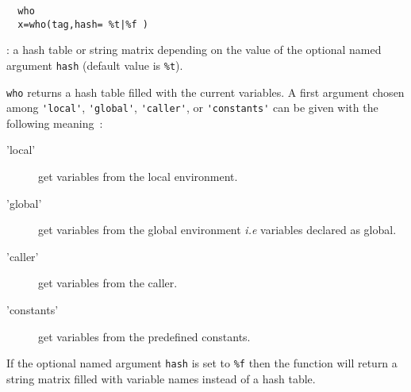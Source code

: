 \begin{mandesc}
\end{mandesc}

\begin{calling_sequence}
\begin{verbatim}
  who
  x=who(tag,hash= %t|%f )  
\end{verbatim}
\end{calling_sequence}
\begin{parameters}
  \begin{varlist}
    : a hash table or string matrix depending on the value of 
    the optional named argument \verb+hash+ (default value is \verb+%t+).
  \end{varlist}
\end{parameters}
\begin{mandescription}
  \verb!who! returns a hash table filled with the current variables. 
  A first argument chosen among \verb+'local'+,  \verb+'global'+,
  \verb+'caller'+, or  \verb+'constants'+ can be given with the following 
  meaning~:
\begin{description}
  \item['local'] get variables from the local environment. 
  \item['global'] get variables from the global environment \emph{i.e} 
    variables declared as global.
  \item['caller'] get variables from the caller. 
  \item['constants'] get variables from the predefined constants. 
\end{description}
  If the optional 
  named argument \verb+hash+ is set to \verb+%f+ then the function will 
  return a string matrix filled with variable names instead of a hash table.
\end{mandescription} 


